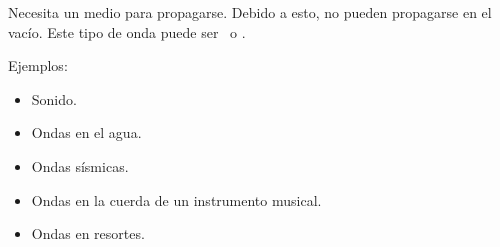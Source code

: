 Necesita un medio para propagarse. Debido a esto, no pueden propagarse en el vacío. Este tipo de onda puede ser \longitudinal\ o \transversal.

Ejemplos:

\begin{itemize}
  \item Sonido.
  \item Ondas en el agua.
  \item Ondas sísmicas.
  \item Ondas en la cuerda de un instrumento musical.
  \item Ondas en resortes.
\end{itemize}
